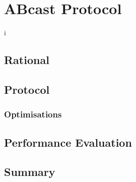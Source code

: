 \chapter{ABcast Protocol}

    \graphicspath{{Chapter5-ABcast/Figs/Vector/}{Chapter5-ABcast/Figs/}}i


\section{Rational}

\section{Protocol}
	\subsection{Optimisations}
	
\section{Performance Evaluation}

\section{Summary}